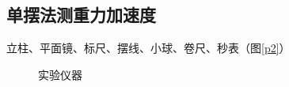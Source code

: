 \documentclass[a4paper]{article}%
\begin{document}
\subsection{单摆法测重力加速度}
立柱、平面镜、标尺、摆线、小球、卷尺、秒表（图\ref{p2}）
\begin{figure}[H]%
    \centering%
    \quad
    \caption{实验仪器}%
\end{figure}
\end{document}
